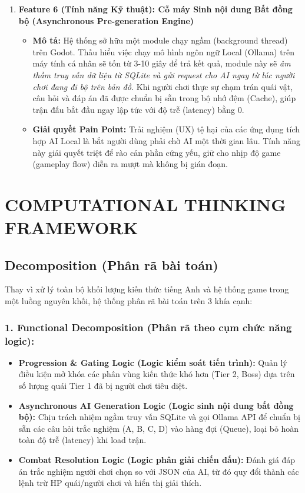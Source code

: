 \begin{enumerate}
\begin{itemize}
	\end{itemize}
	\item \textbf{Feature 6 (Tính năng Kỹ thuật): Cỗ máy Sinh nội dung Bất đồng bộ (Asynchronous Pre-generation Engine)}
	\begin{itemize}
		\item \textbf{Mô tả:} Hệ thống sở hữu một module chạy ngầm (background thread) trên Godot. Thấu hiểu việc chạy mô hình ngôn ngữ Local (Ollama) trên máy tính cá nhân sẽ tốn từ 3-10 giây để trả kết quả, module này sẽ \textit{âm thầm truy vấn dữ liệu từ SQLite và gửi request cho AI ngay từ lúc người chơi đang đi bộ trên bản đồ.} Khi người chơi thực sự chạm trán quái vật, câu hỏi và đáp án đã được chuẩn bị sẵn trong bộ nhớ đệm (Cache), giúp trận đấu bắt đầu ngay lập tức với độ trễ (latency) bằng 0.
		\item \textbf{Giải quyết Pain Point:} Trải nghiệm (UX) tệ hại của các ứng dụng tích hợp AI Local là bắt người dùng phải chờ AI một thời gian lâu. Tính năng này giải quyết triệt để rào cản phần cứng yếu, giữ cho nhịp độ game (gameplay flow) diễn ra mượt mà không bị gián đoạn.
	\end{itemize}
\end{enumerate}

\section{COMPUTATIONAL THINKING FRAMEWORK}

\subsection{Decomposition (Phân rã bài toán)}
Thay vì xử lý toàn bộ khối lượng kiến thức tiếng Anh và hệ thống game trong một luồng nguyên khối, hệ thống phân rã bài toán trên 3 khía cạnh:

\subsubsection*{1. Functional Decomposition (Phân rã theo cụm chức năng logic):}
\begin{itemize}
    \item \textbf{Progression \& Gating Logic (Logic kiểm soát tiến trình):} Quản lý điều kiện mở khóa các phân vùng kiến thức khó hơn (Tier 2, Boss) dựa trên số lượng quái Tier 1 đã bị người chơi tiêu diệt.
    \item \textbf{Asynchronous AI Generation Logic (Logic sinh nội dung bất đồng bộ):} Chịu trách nhiệm ngầm truy vấn SQLite và gọi Ollama API để chuẩn bị sẵn các câu hỏi trắc nghiệm (A, B, C, D) vào hàng đợi (Queue), loại bỏ hoàn toàn độ trễ (latency) khi load trận.
    \item \textbf{Combat Resolution Logic (Logic phân giải chiến đấu):} Đánh giá đáp án trắc nghiệm người chơi chọn so với JSON của AI, từ đó quy đổi thành các lệnh trừ HP quái/người chơi và hiển thị giải thích.
\end{itemize}

